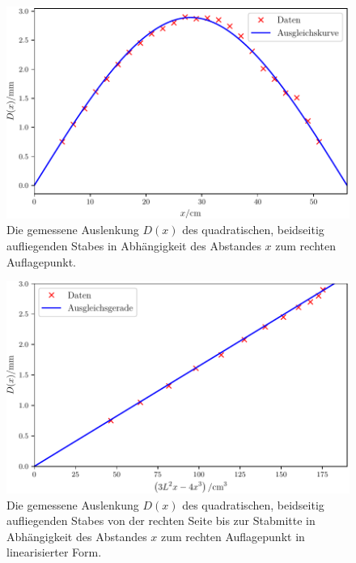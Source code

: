 \begin{figure}
	\centering
	\includegraphics[scale=.8]{content/images/StabQuadratBeidseitig1.pdf}
	\caption{Die gemessene Auslenkung $D(x)$ des quadratischen, beidseitig aufliegenden Stabes in Abhängigkeit des Abstandes $x$ zum rechten Auflagepunkt.}
	\label{fig:beidseitig}
\end{figure}
\begin{figure}
	\centering
	\includegraphics[scale=.8]{content/images/StabQuadratBeidseitig2.pdf}
	\caption{Die gemessene Auslenkung $D(x)$ des quadratischen, beidseitig aufliegenden Stabes von der rechten Seite bis zur Stabmitte in Abhängigkeit des Abstandes $x$ zum rechten Auflagepunkt in linearisierter Form.}
	\label{fig:beidseitiglinear1}
\end{figure}
